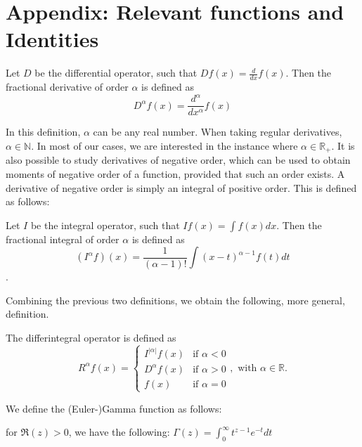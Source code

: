 \section{Appendix: Relevant functions and Identities}\label{s:appendices}
\begin{definition}
    Let \(D\) be the differential operator, such that \(D f(x) = \frac{d}{dx} f(x)\). Then the fractional derivative of order \(\alpha\) is defined as \[D^{\alpha} f(x) = \frac{d^{\alpha}}{dx^{\alpha}} f(x)\]
    \cite{samko1993}
\end{definition}
In this definition, \(\alpha\) can be any real number. When taking regular derivatives, \(\alpha \in \mathbb{N}\). In most of our cases, we are interested in the instance where  \(\alpha \in \mathbb{R}_+\). It is also possible to study derivatives of negative order, which can be used to obtain moments of negative order of a function, provided that such an order exists. A derivative of negative order is simply an integral of positive order. This is defined as follows:
\begin{definition}
    Let \(I\) be the integral operator, such that \(I f(x) = \int f(x) dx\). Then the fractional integral of order \(\alpha\) is defined as \[(I^{\alpha} f) (x) = \frac{1}{(\alpha-1)!}\int (x-t)^{\alpha-1} f(t) dt\] \cite{cauchy1823}.
\end{definition} 

Combining the previous two definitions, we obtain the following, more general, definition.
\begin{definition}\label{d: differintegral}
    The differintegral operator is defined as
    \begin{equation}
        R^\alpha f(x) = \begin{cases}
            I^{|\alpha|} f(x) & \text{if } \alpha < 0 \\
            D^\alpha f(x) & \text{if } \alpha > 0 \\
            f(x) & \text{if } \alpha = 0
        \end{cases}, \text{ with } \alpha \in \mathbb{R}.
        \end{equation}
        \cite{oldham1974}
\end{definition}

We define the (Euler-)Gamma function as follows:
\begin{definition}\label{d: eg}
    for \(\Re(z) > 0\), we have the following: \(\Gamma(z) = \int_{0}^{\infty} t^{z-1} e^{-t} dt\)
\end{definition}

